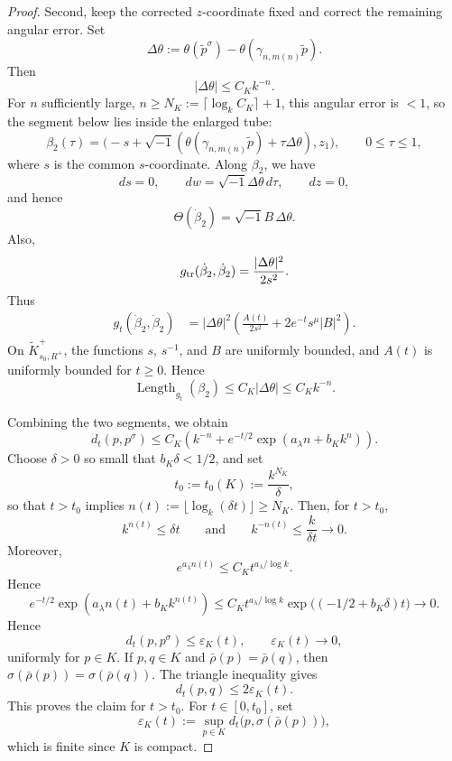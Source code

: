 \documentclass[12pt]{amsart}
\numberwithin{equation}{section}
\theoremstyle{remark}
\theoremstyle{definition}
\begin{document}
\begin{proof}
Second, keep the corrected $z$-coordinate fixed and correct the remaining
angular error. Set
$$
\Delta\theta
:=
\theta(\tilde p^\sigma)-\theta( \gamma_{n,m(n)}\tilde p).
$$
Then
$$
|\Delta\theta|\leq C_Kk^{-n}.
$$
For $n$ sufficiently large,  $n\ge N_K:=\lceil\log_kC_K\rceil+1$, this angular error is $<1$, so the segment below lies inside
the enlarged tube:
\begin{equation*}
\beta_2(\tau)
=
\bigl(
-s+\sqrt{-1}(\theta( \gamma_{n,m(n)}\tilde p)+\tau\Delta\theta),
z_1
\bigr),
\qquad
0\leq\tau\leq1,
\end{equation*}
where $s$ is the common $s$-coordinate. Along $\beta_2$, we have
$$
ds=0,
\qquad
dw=\sqrt{-1}\Delta\theta\,d\tau,
\qquad
dz=0,
$$
and hence
$$
\Theta(\dot\beta_2)=\sqrt{-1}B\,\Delta\theta.
$$
Also,
$$
g_{\rm tr}(\dot\beta_2,\dot\beta_2)
=
\frac{|\Delta\theta|^2}{2s^2}.
$$
Thus
\begin{align*}
g_t(\dot\beta_2,\dot\beta_2)
&=
|\Delta\theta|^2
\left(
\frac{A(t)}{2s^2}
+
2e^{-t}s^\mu |B|^2
\right).
\end{align*}
On $\widetilde K^+_{s_0,R^+}$, the functions $s$, $s^{-1}$, and $B$ are uniformly bounded, and $A(t)$ is uniformly bounded for $t\geq0$. Hence
$$
\operatorname{Length}_{g_t}(\beta_2)
\leq
C_K|\Delta\theta|
\leq
C_K k^{-n}.
$$

Combining the two segments, we obtain
\begin{equation*}
d_t(p,p^\sigma)
\leq
C_K\left(k^{-n}+e^{-t/2}\exp(a_\lambda n+b_Kk^n)\right).
\end{equation*}
Choose $\delta>0$ so small that $b_K\delta<1/2$,
and set
\[
t_0:=t_0(K):=\frac{k^{N_K}}{\delta},
\]
so that $t>t_0$ implies $n(t):=\lfloor\log_k(\delta t)\rfloor\ge N_K$. Then, for
$t>t_0$,
$$
k^{n(t)}\leq \delta t
\qquad\text{and}\qquad
k^{-n(t)}\leq \frac{k}{\delta t}\longrightarrow0.
$$
Moreover,
$$
e^{a_\lambda n(t)}
\leq
C_K t^{a_\lambda/\log k}.
$$
Hence
$$
e^{-t/2}\exp(a_\lambda n(t)+b_Kk^{n(t)})
\leq
C_K t^{a_\lambda/\log k}
\exp\bigl((-1/2+b_K\delta)t\bigr)
\longrightarrow0.
$$
Hence
$$
d_t(p,p^\sigma)\leq \varepsilon_K(t),
\qquad
\varepsilon_K(t)\to0,
$$
uniformly for $p\in K$. If $p,q\in K$ and
$\bar\rho(p)=\bar\rho(q)$, then $\sigma(\bar\rho(p))=\sigma(\bar\rho(q))$. The triangle inequality gives
$$
d_t(p,q)\leq 2\varepsilon_K(t).
$$
This proves the claim for $t>t_0$. For $t\in[0,t_0]$, set
\[
\varepsilon_K(t):=\sup_{p\in K}d_t\big(p,\sigma(\bar\rho(p))\big),
\]
which is finite since $K$ is compact.
\end{proof}
\end{document}
